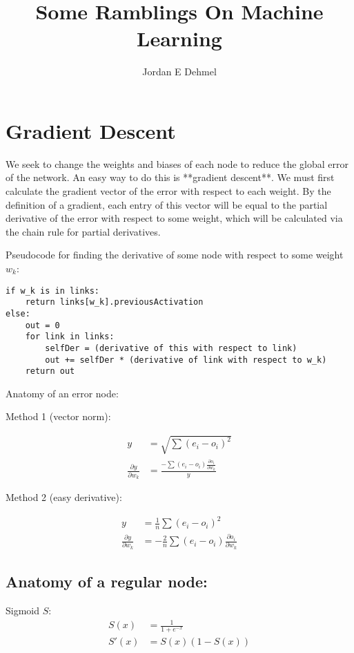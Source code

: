 \documentclass[8pt]{amsart}
\title{Some Ramblings On Machine Learning}
\author{Jordan E Dehmel}
\begin{document}
\maketitle

\section{Gradient Descent}

We seek to change the weights and biases of each node to reduce the
global error of the network. An easy way to do this is **gradient descent**.
We must first calculate the gradient vector of the error with respect to
each weight. By the definition of a gradient, each entry of this vector will
be equal to the partial derivative of the error with respect to some weight,
which will be calculated via the chain rule for partial derivatives.

Pseudocode for finding the derivative of some node with respect to
some weight $w_k$:

\begin{verbatim}
if w_k is in links:
    return links[w_k].previousActivation
else:
    out = 0
    for link in links:
        selfDer = (derivative of this with respect to link)
        out += selfDer * (derivative of link with respect to w_k)
    return out
\end{verbatim}

Anatomy of an error node:

Method 1 (vector norm):

$$
\begin{aligned}
    y &= \sqrt{\sum{(e_i - o_i)^2}} \\
    \frac{\partial y}{\partial w_k} &= \frac{-\sum{(e_i - o_i)\frac{\partial o_i}{\partial w_k}}}{y}
\end{aligned}
$$

Method 2 (easy derivative):

$$
\begin{aligned}
    y &= \frac{1}{n} \sum{(e_i - o_i)^2} \\
    \frac{\partial y}{\partial w_k} &= - \frac{2}{n} \sum{(e_i - o_i) \frac{\partial o_i}{\partial w_k}}
\end{aligned}
$$

\subsection{Anatomy of a regular node:}

Sigmoid $S$:
$$
\begin{aligned}
    S(x) &= \frac{1}{1 + e^{-x}} \\
    S'(x) &= S(x) (1 - S(x))
\end{aligned}
$$
\end{document}
